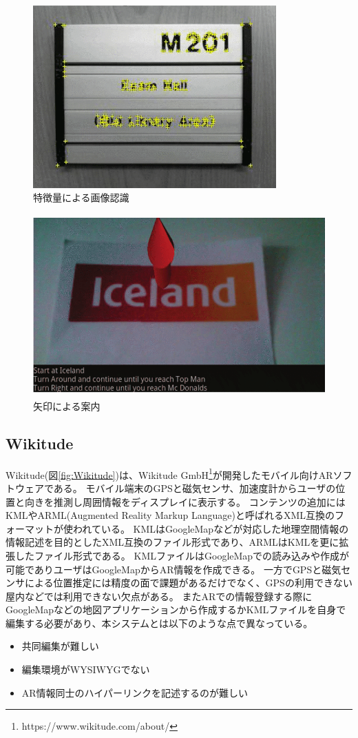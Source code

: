 \begin{figure}[h]
  \centering 
  \includegraphics[height=70mm]{images/FBINUAR_image.png}
  \caption{特徴量による画像認識} \label{fig:FBINUAR_image}
\end{figure}
\begin{figure}[h]
  \centering 
  \includegraphics[height=70mm]{images/FBINUAR_ar.png}
  \caption{矢印による案内} \label{fig:FBINUAR_ar}
\end{figure}


\subsection{Wikitude}
Wikitude(図\ref{fig:Wikitude})は、Wikitude GmbH\footnote{\textsf{https://www.wikitude.com/about/}}が開発したモバイル向けARソフトウェアである。
モバイル端末のGPSと磁気センサ、加速度計からユーザの位置と向きを推測し周囲情報をディスプレイに表示する。
コンテンツの追加にはKMLやARML(Augmented Reality Markup Language)と呼ばれるXML互換のフォーマットが使われている。
KMLはGoogleMapなどが対応した地理空間情報の情報記述を目的としたXML互換のファイル形式であり、ARMLはKMLを更に拡張したファイル形式である。
KMLファイルはGoogleMapでの読み込みや作成が可能でありユーザはGoogleMapからAR情報を作成できる。
一方でGPSと磁気センサによる位置推定には精度の面で課題があるだけでなく、GPSの利用できない屋内などでは利用できない欠点がある。
またARでの情報登録する際にGoogleMapなどの地図アプリケーションから作成するかKMLファイルを自身で編集する必要があり、本システムとは以下のような点で異なっている。
\begin{itemize}
  \item 共同編集が難しい
  \item 編集環境がWYSIWYGでない
  \item AR情報同士のハイパーリンクを記述するのが難しい
\end{itemize}

